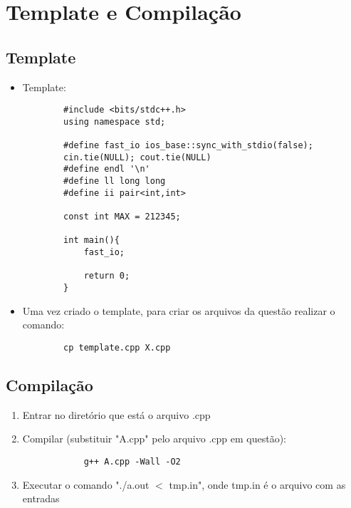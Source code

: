 \section{Template e Compilação}
\subsection{Template}
\begin{itemize}
    \item Template:
    \begin{verbatim}
        #include <bits/stdc++.h>
        using namespace std;

        #define fast_io ios_base::sync_with_stdio(false); 
        cin.tie(NULL); cout.tie(NULL)
        #define endl '\n'
        #define ll long long
        #define ii pair<int,int>

        const int MAX = 212345;

        int main(){
            fast_io;

            return 0;
        }
    \end{verbatim}
    \item Uma vez criado o template, para criar os arquivos da questão realizar o comando:
    \begin{verbatim}
        cp template.cpp X.cpp
    \end{verbatim}

\end{itemize}

\subsection{Compilação}
    \begin{enumerate}
        \item Entrar no diretório que está o arquivo .cpp
        \item Compilar (substituir "A.cpp" pelo arquivo .cpp em questão): 
        \begin{verbatim}
            g++ A.cpp -Wall -O2
        \end{verbatim}
        \item Executar o comando "./a.out $<$ tmp.in", onde tmp.in é o arquivo com as entradas\\
    \end{enumerate}
\pagebreak

